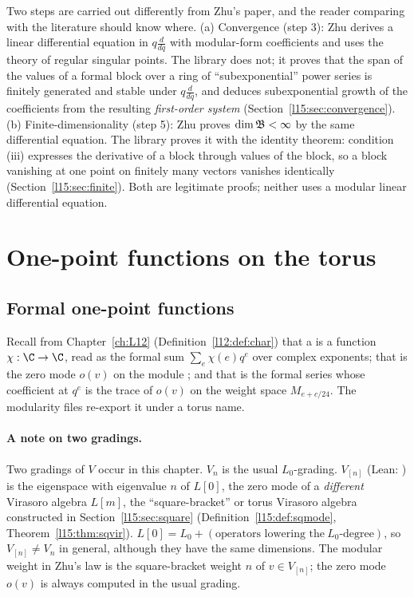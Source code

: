 \begin{remark}\label{l15:rem:diff}
Two steps are carried out differently from Zhu's paper, and the reader comparing with the literature should know where.
(a) Convergence (step 3): Zhu derives a linear differential equation in $q\frac{d}{dq}$ with modular-form coefficients
and uses the theory of regular singular points. The library does not; it proves that the span of the values of a
formal block over a ring of ``subexponential'' power series is finitely generated and stable under $q\frac{d}{dq}$, and
deduces subexponential growth of the coefficients from the resulting \emph{first-order system}
(Section~\ref{l15:sec:convergence}). (b) Finite-dimensionality (step 5): Zhu proves $\dim\mathfrak{B}<\infty$ by the same
differential equation. The library proves it with the identity theorem: condition (iii) expresses the derivative of a
block through values of the block, so a block vanishing at one point on finitely many vectors vanishes identically
(Section~\ref{l15:sec:finite}). Both are legitimate proofs; neither uses a modular linear differential equation.
\end{remark}

\section{One-point functions on the torus}\label{l15:sec:traces}

\subsection{Formal one-point functions}

Recall from Chapter~\ref{ch:L12} (Definition~\ref{l12:def:char}) that a  is a function
$\chi:\C\to\C$, read as the formal sum $\sum_{e}\chi(e)q^e$ over complex exponents; that  is the zero
mode $o(v)$ on the module ; and that  is the formal series whose coefficient at $q^e$ is the
trace of $o(v)$ on the weight space $M_{e+c/24}$. The modularity files re-export it under a torus name.

\paragraph{A note on two gradings.} Two gradings of $V$ occur in this chapter. $V_n$ is the usual $L_0$-grading.
$V_{[n]}$ (Lean: ) is the eigenspace with eigenvalue $n$ of $L[0]$, the zero mode of a
\emph{different} Virasoro algebra $L[m]$, the ``square-bracket'' or torus Virasoro algebra constructed in
Section~\ref{l15:sec:square} (Definition~\ref{l15:def:sqmode}, Theorem~\ref{l15:thm:sqvir}). $L[0]=L_0+(\text{operators lowering the}
\ L_0\text{-degree})$, so $V_{[n]}\neq V_n$ in general, although they have the same dimensions. The modular weight in
Zhu's law is the square-bracket weight $n$ of $v\in V_{[n]}$; the zero mode $o(v)$ is always computed in the usual grading.

